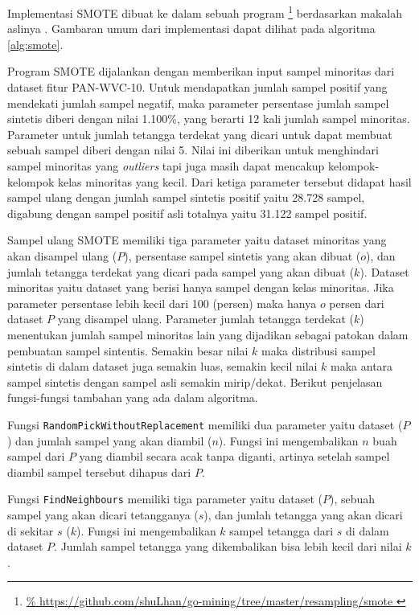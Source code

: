 Implementasi SMOTE dibuat ke dalam sebuah program
\footnote{\url{%
https://github.com/shuLhan/go-mining/tree/master/resampling/smote
}}
berdasarkan makalah aslinya
\parencite{chawla2002smote}.
Gambaran umum dari implementasi dapat dilihat pada algoritma \ref{alg:smote}.

Program SMOTE dijalankan dengan memberikan input sampel minoritas dari dataset
fitur PAN-WVC-10.
Untuk mendapatkan jumlah sampel positif yang mendekati jumlah sampel negatif,
maka parameter persentase jumlah sampel sintetis diberi dengan nilai 1.100\%,
yang berarti 12 kali jumlah sampel minoritas.
Parameter untuk jumlah tetangga terdekat yang dicari untuk dapat membuat sebuah
sampel diberi dengan nilai 5.
Nilai ini diberikan untuk menghindari sampel minoritas yang \textit{outliers}
tapi juga masih dapat mencakup kelompok-kelompok kelas minoritas yang kecil.
Dari ketiga parameter tersebut didapat hasil sampel ulang dengan jumlah sampel
sintetis positif yaitu 28.728 sampel, digabung dengan sampel positif asli
totalnya yaitu 31.122 sampel positif.

	

Sampel ulang SMOTE memiliki tiga parameter yaitu dataset minoritas yang akan
disampel ulang ($P$), persentase sampel sintetis yang akan
dibuat ($o$), dan jumlah tetangga terdekat yang dicari pada sampel
yang akan dibuat ($k$).
Dataset minoritas yaitu dataset yang berisi hanya sampel dengan kelas
minoritas.
Jika parameter persentase lebih kecil dari 100 (persen) maka hanya $o$ persen
dari dataset $P$ yang disampel ulang.
Parameter jumlah tetangga terdekat ($k$) menentukan jumlah sampel minoritas
lain yang dijadikan sebagai patokan dalam pembuatan sampel sintentis.
Semakin besar nilai $k$ maka distribusi sampel sintetis di dalam dataset juga
semakin luas, semakin kecil nilai $k$ maka antara sampel sintetis
dengan sampel asli semakin mirip/dekat.
Berikut penjelasan fungsi-fungsi tambahan yang ada dalam algoritma.

Fungsi \texttt{RandomPickWithoutReplacement} memiliki dua parameter yaitu
dataset ($P$) dan jumlah sampel yang akan diambil ($n$).  Fungsi ini
mengembalikan $n$ buah sampel dari $P$ yang diambil secara acak tanpa diganti,
artinya setelah sampel diambil sampel tersebut dihapus dari $P$.

Fungsi \texttt{FindNeighbours} memiliki tiga parameter yaitu dataset ($P$),
sebuah sampel yang akan dicari tetangganya ($s$), dan jumlah tetangga yang akan
dicari di sekitar $s$ ($k$).
Fungsi ini mengembalikan $k$ sampel tetangga dari $s$ di dalam dataset $P$.
Jumlah sampel tetangga yang dikembalikan bisa lebih kecil dari nilai $k$.

